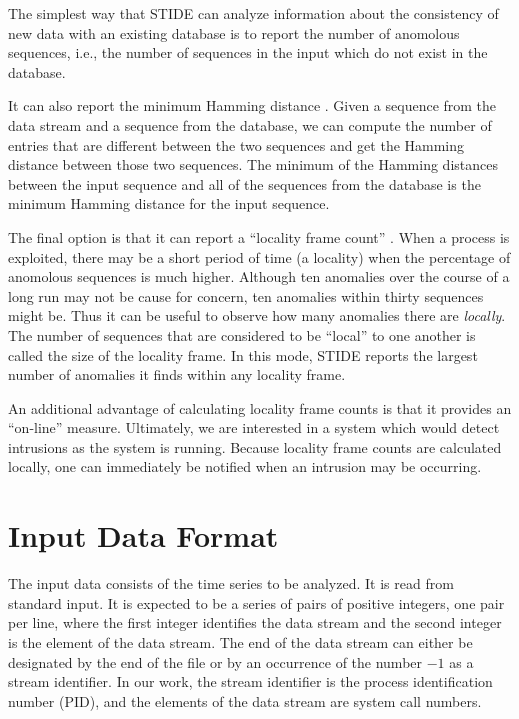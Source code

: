 \documentclass{amsart}
\begin{document}
The simplest way that STIDE can analyze information about the
consistency of new data with an existing database is to report the
number of anomolous sequences, i.e., the number of sequences in the
input which do not exist in the database.

It can also report the minimum Hamming distance \cite{lightweight}.
Given a sequence from the data stream and a sequence from the
database, we can compute the number of entries that are different
between the two sequences and get the Hamming distance between those
two sequences.  The minimum of the Hamming distances between the input
sequence and all of the sequences from the database is the minimum
Hamming distance for the input sequence.

The final option is that it can report a ``locality frame count''
\cite{ci}.  When a process is exploited, there may be a short period
of time (a locality) when the percentage of anomolous sequences is
much higher.  Although ten anomalies over the course of a long
run may not be cause for concern, ten anomalies within thirty
sequences might be.  Thus it can be useful to observe how many
anomalies there are {\it locally}.  The number of sequences that are
considered to be ``local'' to one another is called the size of the
locality frame.  In this mode, STIDE reports the largest number of
anomalies it finds within any locality frame.

An additional advantage of calculating locality frame counts is that
it provides an ``on-line'' measure.  Ultimately, we are interested in a
system which would detect intrusions as the system is running.
Because locality frame counts are calculated locally, one can
immediately be notified when an intrusion may be occurring.

\section{Input Data Format} \label{sec:input}
The input data consists of the time series to be analyzed.  It is read
from standard input.  It is expected to be a series of pairs of
positive integers, one pair per line, where the first integer
identifies the data stream and the second integer is the element of
the data stream.  The end of the data stream can either be designated
by the end of the file or by an occurrence of the number $-1$ as a
stream identifier.  In our work, the stream identifier is the process
identification number (PID), and the elements of the data stream are
system call numbers.  
\end{document}

